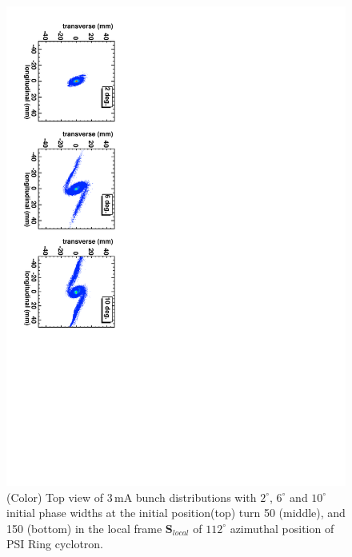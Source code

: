 \documentclass[aps,prstab,twocolumn,superscriptaddress,showpacs]{revtex4}
\newcommand{\bs}[1]{\mathbf #1}
\begin{document}
\begin{figure}
  \includegraphics[angle=90,width=0.9\linewidth]{figures/Turn-150.pdf}
  \caption{(Color) Top view of 3\,mA bunch distributions with  $2^\circ$, $6^\circ$ and $10^\circ$ initial phase widths at the initial position(top) turn 50 (middle), and 150 (bottom) 
    in the local frame ${\bs{S}_{local}}$ of $112^\circ$ azimuthal position of PSI Ring cyclotron. }
  \label{fig:RingPhaseWidth}
\end{figure}
\end{document}
